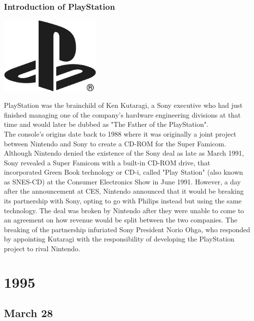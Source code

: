 \documentclass[11pt]{report}
\begin{document}
\subsection{Introduction of PlayStation}
\vspace{2mm}\begin{center}\includegraphics[width=5cm]{./img/playstationLogo.jpg}\end{center}
PlayStation was the brainchild of Ken Kutaragi, a Sony executive who had just finished managing one of the company's hardware engineering divisions at that time and would later be dubbed as "The Father of the PlayStation".\\ \indent The console's origins date back to 1988 where it was originally a joint project between Nintendo and Sony to create a CD-ROM for the Super Famicom. Although Nintendo denied the existence of the Sony deal as late as March 1991, Sony revealed a Super Famicom with a built-in CD-ROM drive, that incorporated Green Book technology or CD-i, called "Play Station" (also known as SNES-CD) at the Consumer Electronics Show in June 1991. However, a day after the announcement at CES, Nintendo announced that it would be breaking its partnership with Sony, opting to go with Philips instead but using the same technology. The deal was broken by Nintendo after they were unable to come to an agreement on how revenue would be split between the two companies. The breaking of the partnership infuriated Sony President Norio Ohga, who responded by appointing Kutaragi with the responsibility of developing the PlayStation project to rival Nintendo.

\chapter{1995}
\section{March 28}
\end{document}
